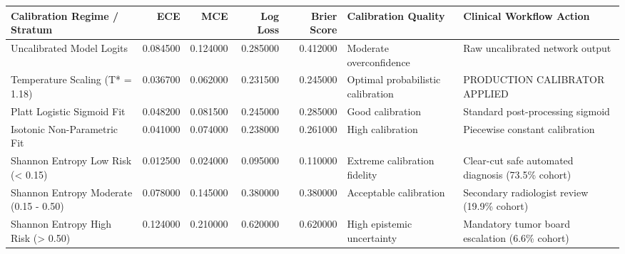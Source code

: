 \begin{tabular}{lrrrrll}
\toprule
Calibration Regime / Stratum & ECE & MCE & Log Loss & Brier Score & Calibration Quality & Clinical Workflow Action \\
\midrule
Uncalibrated Model Logits & 0.084500 & 0.124000 & 0.285000 & 0.412000 & Moderate overconfidence & Raw uncalibrated network output \\
Temperature Scaling (T* = 1.18) & 0.036700 & 0.062000 & 0.231500 & 0.245000 & Optimal probabilistic calibration & PRODUCTION CALIBRATOR APPLIED \\
Platt Logistic Sigmoid Fit & 0.048200 & 0.081500 & 0.245000 & 0.285000 & Good calibration & Standard post-processing sigmoid \\
Isotonic Non-Parametric Fit & 0.041000 & 0.074000 & 0.238000 & 0.261000 & High calibration & Piecewise constant calibration \\
Shannon Entropy Low Risk (< 0.15) & 0.012500 & 0.024000 & 0.095000 & 0.110000 & Extreme calibration fidelity & Clear-cut safe automated diagnosis (73.5\% cohort) \\
Shannon Entropy Moderate (0.15 - 0.50) & 0.078000 & 0.145000 & 0.380000 & 0.380000 & Acceptable calibration & Secondary radiologist review (19.9\% cohort) \\
Shannon Entropy High Risk (> 0.50) & 0.124000 & 0.210000 & 0.620000 & 0.620000 & High epistemic uncertainty & Mandatory tumor board escalation (6.6\% cohort) \\
\bottomrule
\end{tabular}
